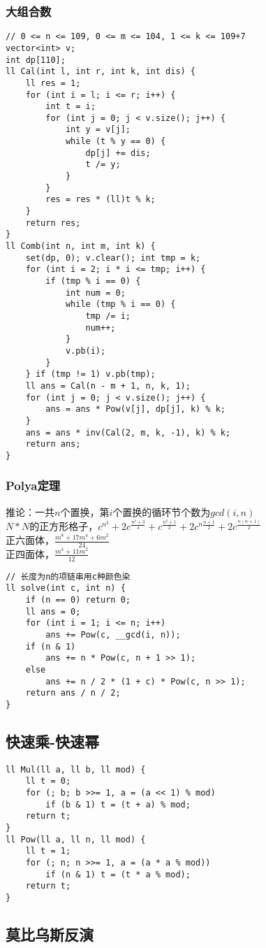 \documentclass[a4paper]{article}
\begin{document}
\subsubsection{大组合数}
\begin{lstlisting}
// 0 <= n <= 109, 0 <= m <= 104, 1 <= k <= 109+7
vector<int> v;
int dp[110];
ll Cal(int l, int r, int k, int dis) {
	ll res = 1;
	for (int i = l; i <= r; i++) {
		int t = i;
		for (int j = 0; j < v.size(); j++) {
			int y = v[j];
			while (t % y == 0) {
				dp[j] += dis;
				t /= y;
			}
		}
		res = res * (ll)t % k;
	}
	return res;
}
ll Comb(int n, int m, int k) {
	set(dp, 0); v.clear(); int tmp = k;
	for (int i = 2; i * i <= tmp; i++) {
		if (tmp % i == 0) {
			int num = 0;
			while (tmp % i == 0) {
				tmp /= i;
				num++;
			}
			v.pb(i);
		}
	} if (tmp != 1) v.pb(tmp);
	ll ans = Cal(n - m + 1, n, k, 1);
	for (int j = 0; j < v.size(); j++) {
		ans = ans * Pow(v[j], dp[j], k) % k;
	}
	ans = ans * inv(Cal(2, m, k, -1), k) % k;
	return ans;
}
\end{lstlisting}
\subsubsection{Polya定理}
推论：一共$n$个置换，第$i$个置换的循环节个数为$gcd(i,n)$ \\
$N*N$的正方形格子，$c^{n^2}+2c^{\frac{n^2+3}{4}}+c^{\frac{n^2+1}{2}}+2c^{n\frac{n+1}{2}}+2c^{\frac{n(n+1)}{2}}$ \\
正六面体，$\frac{m^8+17m^4+6m^2}{24}$ \\
正四面体，$\frac{m^4+11m^2}{12}$\begin{lstlisting}
// 长度为n的项链串用c种颜色染
ll solve(int c, int n) {
	if (n == 0) return 0;
	ll ans = 0;
	for (int i = 1; i <= n; i++)
		ans += Pow(c, __gcd(i, n));
	if (n & 1)
		ans += n * Pow(c, n + 1 >> 1);
	else
		ans += n / 2 * (1 + c) * Pow(c, n >> 1);
	return ans / n / 2;
}
\end{lstlisting}
\subsection{快速乘-快速幂}
\begin{lstlisting}
ll Mul(ll a, ll b, ll mod) {
	ll t = 0;
	for (; b; b >>= 1, a = (a << 1) % mod)
		if (b & 1) t = (t + a) % mod;
	return t;
} 
ll Pow(ll a, ll n, ll mod) {
	ll t = 1;
	for (; n; n >>= 1, a = (a * a % mod))
		if (n & 1) t = (t * a % mod);
	return t;
}
\end{lstlisting}
\subsection{莫比乌斯反演}
\end{document}
